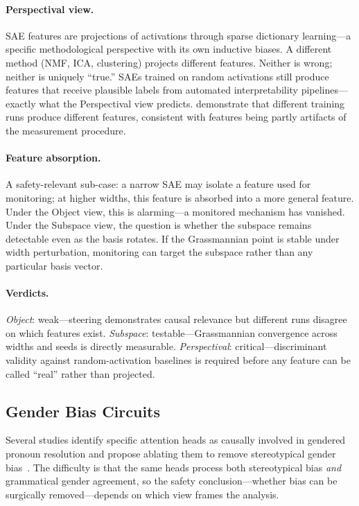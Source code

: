 \documentclass{article}
\begin{document}
\paragraph{Perspectival view.}
SAE features are projections of activations through sparse dictionary
learning---a specific methodological perspective with its own inductive
biases. A different method (NMF, ICA, clustering) projects different
features. Neither is wrong; neither is uniquely ``true.'' SAEs trained
on random activations still produce features that receive plausible
labels from automated interpretability pipelines---exactly what the
Perspectival view predicts. \citet{leask2025} demonstrate that different
training runs produce different features, consistent with features being
partly artifacts of the measurement procedure.

\paragraph{Feature absorption.}
A safety-relevant sub-case: a narrow SAE may isolate a feature used for
monitoring; at higher widths, this feature is absorbed into a more
general feature. Under the Object view, this is alarming---a monitored
mechanism has vanished. Under the Subspace view, the question is whether
the subspace remains detectable even as the basis rotates. If the
Grassmannian point is stable under width perturbation, monitoring can
target the subspace rather than any particular basis vector.

\paragraph{Verdicts.}
\emph{Object}: weak---steering demonstrates causal relevance but
different runs disagree on which features exist.
\emph{Subspace}: testable---Grassmannian convergence across widths and
seeds is directly measurable.
\emph{Perspectival}: critical---discriminant validity against
random-activation baselines is required before any feature can be called
``real'' rather than projected.


\subsection{Gender Bias Circuits}\label{app:cs_gender}

Several studies identify specific attention heads as causally involved in
gendered pronoun resolution and propose ablating them to remove
stereotypical gender bias~\citep{bolukbasi2016, vig2020causal}. The
difficulty is that the same heads process both stereotypical bias
\emph{and} grammatical gender agreement, so the safety
conclusion---whether bias can be surgically removed---depends on which
view frames the analysis.
\end{document}
